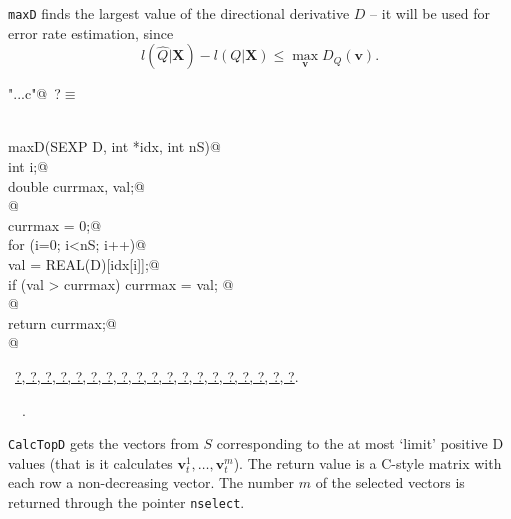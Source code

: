 \documentclass[reqno]{amsart}
\renewcommand{\NWtarget}[2]{\hypertarget{#1}{#2}}
\renewcommand{\NWlink}[2]{\hyperlink{#1}{#2}}
\newcommand{\bv}{\mathbf{v}}
\begin{document}
\texttt{maxD} finds the largest value of the directional derivative $D$ --
it will be used for error rate estimation, since
\begin{equation}\label{E:relerror}
  l(\hat{Q}|\mathbf{X}) - l(Q|\mathbf{X}) \leq  \max_\bv D_Q(\bv).
\end{equation}

\begin{flushleft} \small
\begin{minipage}{\linewidth}\label{scrap26}\raggedright\small
\NWtarget{nuweb?}{} \verb@"..\src\ReprodCalcs.c"@\nobreak\ {\footnotesize {?}}$\equiv$
\vspace{-1ex}
\begin{list}{}{} \item
\mbox{}\verb@@\\
\mbox{}\verb@double maxD(SEXP D, int *idx, int nS){@\\
\mbox{}\verb@   int i;@\\
\mbox{}\verb@   double currmax, val;@\\
\mbox{}\verb@   @\\
\mbox{}\verb@   currmax = 0;@\\
\mbox{}\verb@   for (i=0; i<nS; i++){@\\
\mbox{}\verb@           val = REAL(D)[idx[i]];@\\
\mbox{}\verb@           if (val > currmax) currmax = val; @\\
\mbox{}\verb@   }@\\
\mbox{}\verb@   return currmax;@\\
\mbox{}\verb@}@\\
\mbox{}\verb@@{\NWsep}
\end{list}
\vspace{-1.5ex}
\footnotesize
\begin{list}{}{\setlength{\itemsep}{-\parsep}\setlength{\itemindent}{-\leftmargin}}
\item \NWtxtFileDefBy\ \NWlink{nuweb?}{?}\NWlink{nuweb?}{, ?}\NWlink{nuweb?}{, ?}\NWlink{nuweb?}{, ?}\NWlink{nuweb?}{, ?}\NWlink{nuweb?}{, ?}\NWlink{nuweb?}{, ?}\NWlink{nuweb?}{, ?}\NWlink{nuweb?}{, ?}\NWlink{nuweb?}{, ?}\NWlink{nuweb?}{, ?}\NWlink{nuweb?}{, ?}\NWlink{nuweb?}{, ?}\NWlink{nuweb?}{, ?}\NWlink{nuweb?}{, ?}\NWlink{nuweb?}{, ?}\NWlink{nuweb?}{, ?}\NWlink{nuweb?}{, ?}\NWlink{nuweb?}{, ?}.
\item \NWtxtIdentsDefed\nobreak\  \verb@MaxD@\nobreak\ \NWtxtIdentsNotUsed.
\item{}
\end{list}
\end{minipage}\vspace{4ex}
\end{flushleft}
\texttt{CalcTopD} gets the vectors from $S$ corresponding to the at most 
`limit' positive D values (that is it calculates $\bv^1_t, \ldots, \bv^m_t$).
The return value is a C-style matrix with each row a non-decreasing vector.
The number $m$ of the selected vectors is returned through the pointer 
\texttt{nselect}.
\end{document}
